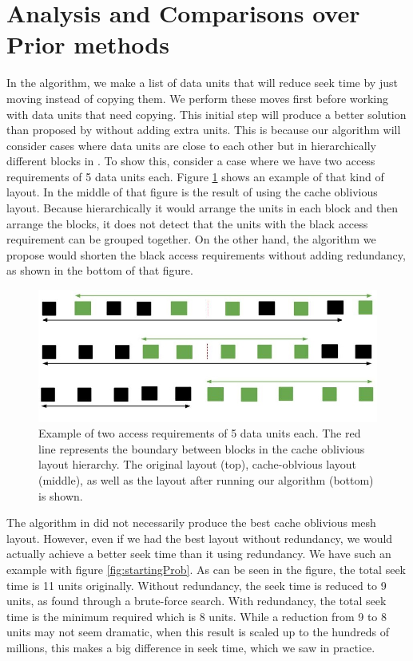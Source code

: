 
\section{Analysis and Comparisons over Prior methods}

In the algorithm, we make a list of data units that will reduce seek time by just moving instead of copying them. We perform these moves first before working with data units that need copying. This initial step will produce a better solution than proposed by \cite{cacheobliviouslayout} without adding extra units. This is because our algorithm will consider cases where data units are close to each other but in hierarchically different blocks in \cite{cacheobliviouslayout}. To show this, consider a case where we have two access requirements of 5 data units each. Figure \ref{YoonImprovement} shows an example of that kind of layout. In the middle of that figure is the result of using the cache oblivious layout. Because hierarchically it would arrange the units in each block and then arrange the blocks, it does not detect that the units with the black access requirement can be grouped together. On the other hand, the algorithm we propose would shorten the black access requirements without adding redundancy, as shown in the bottom of that figure.

\begin{figure}[ht]
\centering
\includegraphics[width=\columnwidth]{ImprovementOverYoon.jpg}
\caption{Example of two access requirements of 5 data units each. The red line represents the boundary between blocks in the cache oblivious layout hierarchy. The original layout (top), cache-oblvious layout (middle), as well as the layout after running our algorithm (bottom) is shown.}
\label{YoonImprovement}
\end{figure}

The algorithm in \cite{cacheobliviouslayout} did not necessarily produce the best cache oblivious mesh layout. However, even if we had the best layout without redundancy, we would actually achieve a better seek time than it using redundancy. We have such an example with figure \ref{fig:startingProb}. As can be seen in the figure, the total seek time is 11 units originally. Without redundancy, the seek time is reduced to 9 units, as found through a brute-force search. With redundancy, the total seek time is the minimum required which is 8 units. While a reduction from 9 to 8 units may not seem dramatic, when this result is scaled up to the hundreds of millions, this makes a big difference in seek time, which we saw in practice.\\

